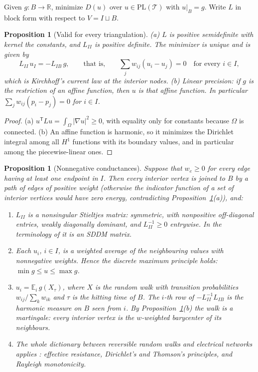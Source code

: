\documentclass[11pt]{amsart}
\newtheorem{proposition}[theorem]{Proposition}
\theoremstyle{definition}
\theoremstyle{remark}
\newcommand{\R}{\mathbb{R}}
\newcommand{\E}{\mathbb{E}}
\newcommand{\cT}{\mathcal{T}}
\newcommand{\PL}{\mathrm{PL}}
\begin{document}
Given $g\colon B\to\R$, minimize $D(u)$ over $u\in\PL(\cT)$ with $u|_B=g$. Write $L$ in block form with respect to $V=I\sqcup B$.

\begin{proposition}[Valid for every triangulation]\label{prop:any}
\textup{(a)} $L$ is positive semidefinite with kernel the constants, and $L_{II}$ is positive definite. The minimizer is unique and is given by
\begin{equation}\label{eq:system}
L_{II}\,u_I=-L_{IB}\,g,\qquad\text{that is,}\qquad \sum_jw_{ij}(u_i-u_j)=0\quad\text{for every } i\in I ,
\end{equation}
which is Kirchhoff's current law at the interior nodes.
\textup{(b)} \emph{Linear precision:} if $g$ is the restriction of an affine function, then $u$ is that affine function. In particular
$\sum_jw_{ij}(p_i-p_j)=0$ for $i\in I$.
\end{proposition}

\begin{proof}
(a) $u^{\mathsf T}Lu=\int_\Omega|\nabla u|^2\ge0$, with equality only for constants because $\Omega$ is connected.
(b) An affine function is harmonic, so it minimizes the Dirichlet integral among all $H^1$ functions with its boundary values, and in particular
among the piecewise-linear ones.
\end{proof}

\begin{proposition}[Nonnegative conductances]\label{prop:pos}
Suppose that $w_e\ge0$ for every edge having at least one endpoint in $I$. Then every interior vertex is joined to $B$ by a path of edges of positive
weight (otherwise the indicator function of a set of interior vertices would have zero energy, contradicting Proposition~\ref{prop:any}(a)), and:
\begin{enumerate}[label=\textup{(\alph*)},leftmargin=*]
\item $L_{II}$ is a nonsingular Stieltjes matrix: symmetric, with nonpositive off-diagonal entries, weakly diagonally dominant, and $L_{II}^{-1}\ge0$ entrywise.
In the terminology of \cite{STsolve} it is an SDDM matrix.
\item Each $u_i$, $i\in I$, is a weighted average of the neighbouring values with nonnegative weights. Hence the discrete maximum principle holds:
$\min g\le u\le\max g$.
\item $u_i=\E_i\,g(X_\tau)$, where $X$ is the random walk with transition probabilities $w_{ij}/\sum_kw_{ik}$ and $\tau$ is the hitting time of $B$. The
$i$-th row of $-L_{II}^{-1}L_{IB}$ is the harmonic measure on $B$ seen from $i$. By Proposition~\ref{prop:any}(b) the walk is a martingale: every interior
vertex is the $w$-weighted barycenter of its neighbours.
\item The whole dictionary between reversible random walks and electrical networks applies \cite{DS84}: effective resistance, Dirichlet's and Thomson's principles, and
Rayleigh monotonicity.
\end{enumerate}
\end{proposition}
\end{document}

